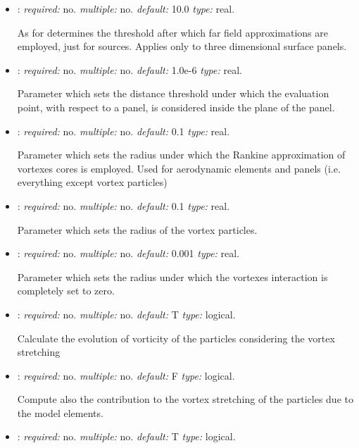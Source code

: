\begin{itemize}
\item {}: \textit{required:} no. \textit{multiple:} no. \textit{default:} 10.0 \textit{type:} real.

As for  determines the threshold after which far field approximations are employed, just for sources. Applies only to three dimensional surface panels. 

\item {}: \textit{required:} no. \textit{multiple:} no. \textit{default:} 1.0e-6 \textit{type:} real.

Parameter which sets the distance threshold under which the evaluation point, with respect to a panel, is considered inside the plane of the panel.

\item {}: \textit{required:} no. \textit{multiple:} no. \textit{default:} 0.1 \textit{type:} real.

Parameter which sets the radius under which the Rankine approximation of vortexes cores is employed. Used for aerodynamic elements and panels (i.e. everything except vortex particles)

\item {}: \textit{required:} no. \textit{multiple:} no. \textit{default:} 0.1 \textit{type:} real.

Parameter which sets the radius of the vortex particles.

\item {}: \textit{required:} no. \textit{multiple:} no. \textit{default:} 0.001 \textit{type:} real. 

Parameter which sets the radius under which the vortexes interaction is completely set to zero.

\item {}: \textit{required:} no. \textit{multiple:} no. \textit{default:} T \textit{type:} logical.

Calculate the evolution of vorticity of the particles considering the vortex stretching

\item {}: \textit{required:} no. \textit{multiple:} no. \textit{default:} F \textit{type:} logical.

Compute also the contribution to the vortex stretching of the particles due to the model elements. 

\item {}: \textit{required:} no. \textit{multiple:} no. \textit{default:} T \textit{type:} logical.


\end{itemize}

